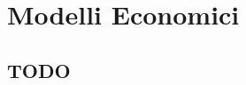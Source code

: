 
\chapter{Modelli Economici}

\section{TODO}

\begin{comment}
 
Introduzione
  Micro economia
  Macro economia
  Variabili discrete
I mercati
  bene
  mercato
  consumatore
  produttore
  concorrenza perfetta
  monopolio
  oligopolio
  concorrenza monopolistica
Funzione di domanda e offerta
  leggi della domanda
    domanda
    offerta
    d=f(p) p>0 decrescente
      modello lineare
      modello parabolico
      modello esponenziale
      modello iperbolico
    esempi
    elasticità della domanda
      totalmente elastica
      elastica
      unitaria
      rigida
      totalmente rigida
  leggi dell'offerta
    r=f(p) p>0 crescente
    coefficiente di elasticità dell'offerta (positivo)
      elastica
      unitaria
      rigida
Legge di mercato
  Regime di concorrenza perfetta
    condizioni
      molti consumatori
      molti produttori
      libertà di acquisto e di vendita
      ogni operatore può entrare o uscire dal mercato 
      c'è trasparenza
      non ci sono coalizioni
      prodotti a larga diffusione
    prezzo di equilibrio
  Cambiamento del prezzo di equilibrio
    a parità di domanda
    a parità di offerta
    con cambiamento sia di domanda sia di offerta
Funzione di utilità
  paniere di consumo
    relazione tra panieri
      preferito
      indifferente
    proprietà
      riflessiva
      transitiva
      completezza
      continuità
      non sazietà
      stretta convessità
    funzione di utilità
      curva di livello o curve di indifferenza
      saggio marginale di sostituzione
        caratteristiche delle curve di indifferenza
          decrescenti
          concavità verso l'alto
          non si intersecano
          curve più alte->soddisfazione più elevata
        casi estremi
          sostituti perfetti
          complementari perfetti

\end{comment}

